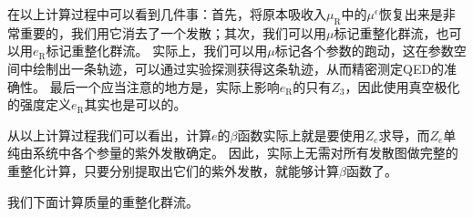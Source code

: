 \documentclass[hyperref, UTF8, a4paper]{ctexart}
\begin{document}
在以上计算过程中可以看到几件事：首先，将原本吸收入$\mu_\text{R}$中的$\mu^\epsilon$恢复出来是非常重要的，我们用它消去了一个发散；其次，我们可以用$\mu$标记重整化群流，也可以用$e_\text{R}$标记重整化群流。
实际上，我们可以用$\mu$标记各个参数的跑动，这在参数空间中绘制出一条轨迹，可以通过实验探测获得这条轨迹，从而精密测定QED的准确性。
最后一个应当注意的地方是，实际上影响$e_\text{R}$的只有$Z_3$，因此使用真空极化的强度定义$e_\text{R}$其实也是可以的。

从以上计算过程我们可以看出，计算$e$的$\beta$函数实际上就是要使用$Z_e$求导，而$Z_e$单纯由系统中各个参量的紫外发散确定。
因此，实际上无需对所有发散图做完整的重整化计算，只要分别提取出它们的紫外发散，就能够计算$\beta$函数了。

我们下面计算质量的重整化群流。
\end{document}
